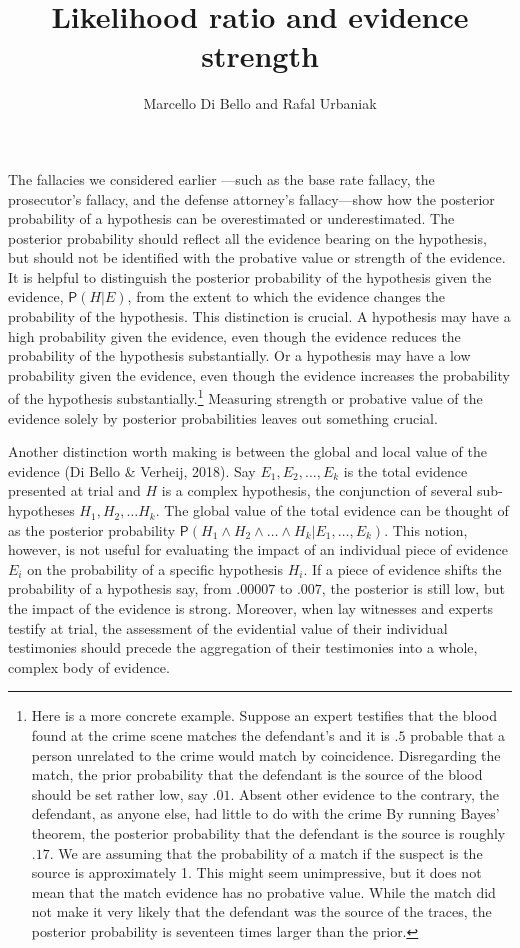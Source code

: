 \documentclass[
  10pt,
  dvipsnames,enabledeprecatedfontcommands]{scrartcl}
\title{Likelihood ratio and evidence strength}
\author{Marcello Di Bello and Rafal Urbaniak}
\date{}
\newcommand{\pr}[1]{\mathsf{P}(#1)}
\begin{document}
\maketitle

The fallacies we considered earlier ---such as the
base rate fallacy, the prosecutor's fallacy, and the defense attorney's
fallacy---show how the posterior probability of a hypothesis can be
overestimated or underestimated. The posterior probability should
reflect all the evidence bearing on the hypothesis, but should not be
identified with the probative value or strength of the evidence. It is
helpful to distinguish the posterior probability of the hypothesis given
the evidence, \(\pr{H \vert E}\), from the extent to which the evidence
changes the probability of the hypothesis. This distinction is crucial.
A hypothesis may have a high probability given the evidence, even though
the evidence reduces the probability of the hypothesis substantially. Or
a hypothesis may have a low probability given the evidence, even though
the evidence increases the probability of the hypothesis
substantially.\footnote{Here is a more concrete example. Suppose an
  expert testifies that the blood found at the crime scene matches the
  defendant's and it is \(.5\) probable that a person unrelated to the
  crime would match by coincidence. Disregarding the match, the prior
  probability that the defendant is the source of the blood should be
  set rather low, say \(.01\). Absent other evidence to the contrary,
  the defendant, as anyone else, had little to do with the crime By
  running Bayes' theorem, the posterior probability that the defendant
  is the source is roughly \(.17\). We are assuming that the probability
  of a match if the suspect is the source is approximately 1. This might
  seem unimpressive, but it does not mean that the match evidence has no
  probative value. While the match did not make it very likely that the
  defendant was the source of the traces, the posterior probability is
  seventeen times larger than the prior.} Measuring strength or
probative value of the evidence solely by posterior probabilities leaves
out something crucial.

Another distinction worth making is between the global and local value
of the evidence (Di Bello \& Verheij, 2018). Say \(E_1,E_2,\dots, E_k\)
is the total evidence presented at trial and \(H\) is a complex
hypothesis, the conjunction of several sub-hypotheses
\(H_1, H_2, \dots H_k\). The global value of the total evidence can be
thought of as the posterior probability
\(\pr{H_1 \wedge H_2 \wedge \dots \wedge H_k \vert E_1, \dots, E_k}\).
This notion, however, is not useful for evaluating the impact of an
individual piece of evidence \(E_i\) on the probability of a specific
hypothesis \(H_i\). If a piece of evidence shifts the probability of a
hypothesis say, from \(.00007\) to \(.007\), the posterior is still low,
but the impact of the evidence is strong. Moreover, when lay witnesses
and experts testify at trial, the assessment of the evidential value of
their individual testimonies should precede the aggregation of their
testimonies into a whole, complex body of evidence.
\end{document}
